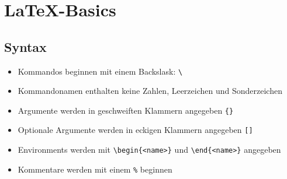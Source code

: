 \documentclass[
    ngerman,
    accentcolor=3b,
    dark_mode,
    fontsize= 12pt,
    a4paper,
    aspectratio=169,
    colorback=true,
    fancy_row_colors,
    leqno,
    fleqn,
    boxarc=3pt,
    fleqn,
]{algoslides}
\begin{document}
    \section{\LaTeX-Basics}\label{2}\label{LaTeX-Basics}
    \subsection{Syntax}
    \begin{frame}[fragile]
        \slidehead{}
        \begin{itemize}
            \item Kommandos beginnen mit einem Backslask: \verb+\+
            \item Kommandonamen enthalten keine Zahlen, Leerzeichen und Sonderzeichen
            \item Argumente werden in geschweiften Klammern angegeben \verb+{}+
            \item Optionale Argumente werden in eckigen Klammern angegeben \verb+[]+
            \item Environments werden mit \verb+\begin{<name>}+ und \verb+\end{<name>}+ angegeben
            \item Kommentare werden mit einem \verb+%+ beginnen
        \end{itemize}
    \end{frame}
\end{document}
